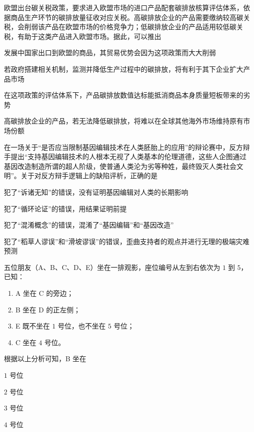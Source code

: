 \documentclass{exam-zh}
\begin{document}
\begin{question}
欧盟出台碳关税政策，要求进入欧盟市场的进口产品配套碳排放核算评估体系，依据商品生产环节的碳排放量征收对应关税。高碳排放企业的产品需要缴纳较高碳关税，会削弱该产品在欧盟市场的价格竞争力；低碳排放企业的产品适用较低碳关税，有助于这类产品进入欧盟市场。据此，可以推出 \paren[]
\begin{choices}
  \item 发展中国家出口到欧盟的商品，其贸易优势会因为这项政策而大大削弱
  \item 若政府搭建相关机制，监测并降低生产过程中的碳排放，将有利于其下企业扩大产品市场
  \item 在这项政策的评估体系下，产品碳排放数值达标能抵消商品本身质量短板带来的劣势
  \item 高碳排放企业的产品，若无法降低碳排放，将难以在全球其他海外市场维持原有市场份额
\end{choices}
\end{question}

\begin{question}
在一场关于“是否应当限制基因编辑技术在人类胚胎上的应用”的辩论赛中，反方辩手提出“支持基因编辑技术的人根本无视了人类基本的伦理道德，这些人企图通过基因改造制造所谓的超人阶级，使普通人类沦为劣等种姓，最终毁灭人类社会文明”。关于对反方辩手逻辑上的缺陷评析，正确的是 \paren[]
\begin{choices}
  \item 犯了“诉诸无知”的错误，没有证明基因编辑对人类的长期影响
  \item 犯了“循环论证”的错误，用结果证明前提
  \item 犯了“混淆概念”的错误，混淆了“基因编辑”和“基因改造”
  \item 犯了“稻草人谬误”和“滑坡谬误”的错误，歪曲支持者的观点并进行无理的极端灾难预测
\end{choices}
\end{question}

\begin{question}
五位朋友（A、B、C、D、E）坐在一排观影，座位编号从左到右依次为 $1$ 到 $5$，已知：
\begin{enumerate}
  \item A 坐在 C 的旁边；
  \item B 坐在 D 的正左侧；
  \item E 既不坐在 $1$ 号位，也不坐在 $5$ 号位；
  \item C 坐在 $4$ 号位。
\end{enumerate}
根据以上分析可知，B 坐在 \paren[]
\begin{choices}
  \item $1$ 号位
  \item $2$ 号位
  \item $3$ 号位
  \item $4$ 号位
\end{choices}
\end{question}
\end{document}
